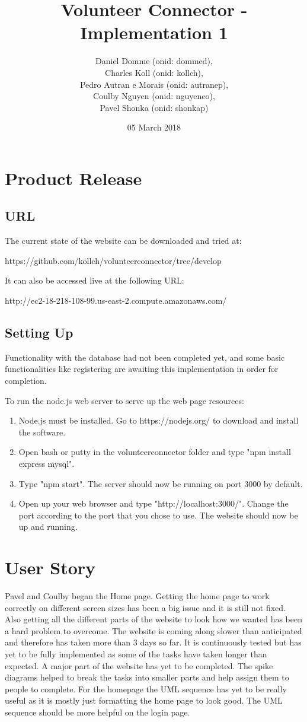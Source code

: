 \documentclass[12pt]{article}
\title{Volunteer Connector - Implementation 1}
\author{Daniel Domme (onid: dommed), \\
Charles Koll (onid: kollch), \\
Pedro Autran e Morais (onid: autranep), \\
Coulby Nguyen (onid: nguyenco), \\
Pavel Shonka (onid: shonkap)
}
\date{05 March 2018}
\begin{document}
\maketitle
\tableofcontents

\pagebreak
\section{Product Release}
\subsection{URL}
	The current state of the website can be downloaded and tried at:

	https://github.com/kollch/volunteerconnector/tree/develop

	It can also be accessed live at the following URL:

	http://ec2-18-218-108-99.us-east-2.compute.amazonaws.com/
\subsection{Setting Up}
	Functionality with the database had not been completed yet, and some basic
	functionalities like registering are awaiting this implementation in
	order for completion.

	To run the node.js web server to serve up the web page resources:
\begin{enumerate}
\item
	Node.js must be installed. Go to https://nodejs.org/ to download and
		install the software.
\item
	Open bash or putty in the volunteerconnector folder and type "npm install
		express mysql".
\item
	Type "npm start". The server should now be running on port 3000 by default.
\item
	Open up your web browser and type "http://localhost:3000/". Change the port
		according to the port that you chose to use. The website should now
		be up and running.
\end{enumerate}
\section{User Story}
	Pavel and Coulby began the Home page. Getting the home page to work correctly on
	different screen sizes has been a big issue and it is still not fixed. Also
	getting all the different parts of the website to look how we wanted has been a
	hard problem to overcome. The website is coming along slower than anticipated
	and therefore has taken more than 3 days so far. It is continuously tested
	but has yet to be fully implemented as some of the tasks have taken longer than
	expected. A major part of the website has yet to be completed. The spike diagrams
	helped to break the tasks into smaller parts and help assign them to people to
	complete. For the homepage the UML sequence has yet to be really useful as it
	is mostly just formatting the home page to look good. The UML sequence should be
	more helpful on the login page.
\end{document}
